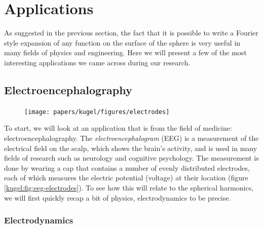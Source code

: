
\section{Applications}

As suggested in the previous section, the fact that it is possible to write a
Fourier style expansion of any function on the surface of the sphere is very
useful in many fields of physics and engineering. Here we will present a few of
the most interesting applications we came across during our research.

\subsection{Electroencephalography}

\begin{figure}
  \centering
    {\texttt{[image: papers/kugel/figures/electrodes]}}
  \qquad
  \caption{
    \label{kugel:fig:eeg}
  }
\end{figure}

To start, we will look at an application that is from the field of medicine:
electroencephalography. The \emph{electroencephalogram} (EEG) is a measurement
of the electrical field on the scalp, which shows the brain's activity, and is
used in many fields of research such as neurology and cognitive psychology.  The
measurement is done by wearing a cap that contains a number of evenly
distributed electrodes, each of which measures the electric potential (voltage)
at their location (figure \ref{kugel:fig:eeg-electrodes}).  To see how this will
relate to the spherical harmonics, we will first quickly recap a bit of physics,
electrodynamics to be precise.


\subsubsection{Electrodynamics}

